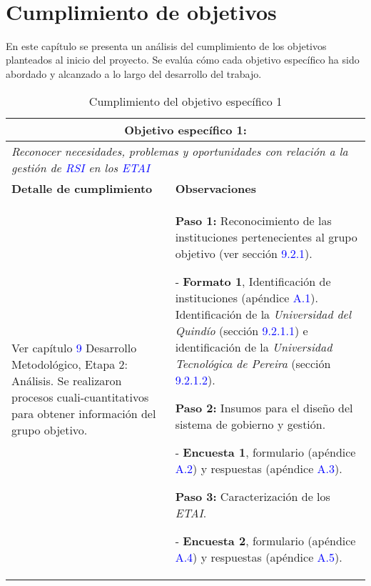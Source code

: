 \label{cap:cumplimiento-objetivos}
\mbox{}\\
\section{Cumplimiento de objetivos}
\noindent
En este capítulo se presenta un análisis del cumplimiento de los objetivos planteados al inicio del proyecto. Se evalúa cómo cada objetivo específico ha sido abordado y alcanzado a lo largo del desarrollo del trabajo.

\begin{table}[H]
\centering
\caption{Cumplimiento del objetivo específico 1}
\label{tab:cumplimiento-objetivo-1}
\begin{tabular}{|p{6cm}|p{9cm}|}
\hline
\multicolumn{2}{|c|}{\textbf{Objetivo específico 1:}} \\
\hline
\multicolumn{2}{|p{15cm}|}{\textit{Reconocer necesidades, problemas y oportunidades con relación a la gestión de \textcolor{blue}{RSI} en los \textcolor{blue}{ETAI}}} \\
\hline
\textbf{Detalle de cumplimiento} & \textbf{Observaciones} \\
\hline
Ver capítulo \textcolor{blue}{9} Desarrollo Metodológico, Etapa 2: Análisis. Se realizaron procesos cuali-cuantitativos para obtener información del grupo objetivo. & 
\textbf{Paso 1:} Reconocimiento de las instituciones pertenecientes al grupo objetivo (ver sección \textcolor{blue}{9.2.1}).

- \textbf{Formato 1}, Identificación de instituciones (apéndice \textcolor{blue}{A.1}). Identificación de la \textit{Universidad del Quindío} (sección \textcolor{blue}{9.2.1.1}) e identificación de la \textit{Universidad Tecnológica de Pereira} (sección \textcolor{blue}{9.2.1.2}).

\textbf{Paso 2:} Insumos para el diseño del sistema de gobierno y gestión.

- \textbf{Encuesta 1}, formulario (apéndice \textcolor{blue}{A.2}) y respuestas (apéndice \textcolor{blue}{A.3}).

\textbf{Paso 3:} Caracterización de los \textit{ETAI}.

- \textbf{Encuesta 2}, formulario (apéndice \textcolor{blue}{A.4}) y respuestas (apéndice \textcolor{blue}{A.5}). \\
\hline
\end{tabular}
\end{table}
